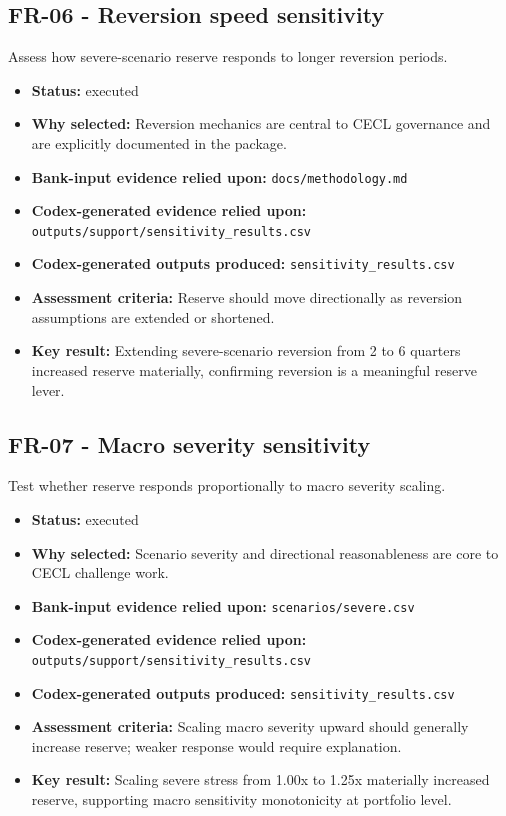 \documentclass[11pt]{article}
\begin{document}
\subsection*{FR-06 - Reversion speed sensitivity}
Assess how severe-scenario reserve responds to longer reversion periods.
\begin{itemize}
\item \textbf{Status:} executed
\item \textbf{Why selected:} Reversion mechanics are central to CECL governance and are explicitly documented in the package.
\item \textbf{Bank-input evidence relied upon:} \texttt{docs/methodology.md}
\item \textbf{Codex-generated evidence relied upon:} \texttt{outputs/support/sensitivity\_results.csv}
\item \textbf{Codex-generated outputs produced:} \texttt{sensitivity\_results.csv}
\item \textbf{Assessment criteria:} Reserve should move directionally as reversion assumptions are extended or shortened.
\item \textbf{Key result:} Extending severe-scenario reversion from 2 to 6 quarters increased reserve materially, confirming reversion is a meaningful reserve lever.
\end{itemize}
\subsection*{FR-07 - Macro severity sensitivity}
Test whether reserve responds proportionally to macro severity scaling.
\begin{itemize}
\item \textbf{Status:} executed
\item \textbf{Why selected:} Scenario severity and directional reasonableness are core to CECL challenge work.
\item \textbf{Bank-input evidence relied upon:} \texttt{scenarios/severe.csv}
\item \textbf{Codex-generated evidence relied upon:} \texttt{outputs/support/sensitivity\_results.csv}
\item \textbf{Codex-generated outputs produced:} \texttt{sensitivity\_results.csv}
\item \textbf{Assessment criteria:} Scaling macro severity upward should generally increase reserve; weaker response would require explanation.
\item \textbf{Key result:} Scaling severe stress from 1.00x to 1.25x materially increased reserve, supporting macro sensitivity monotonicity at portfolio level.
\end{itemize}
\end{document}
